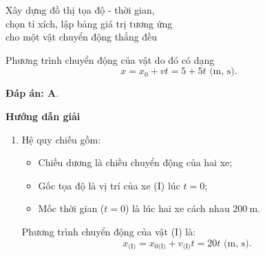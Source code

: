 \begin{dang}{Xây dựng đồ thị tọa độ - thời gian,\\ chọn tỉ xích, lập bảng giá trị tương ứng \\cho một vật chuyển động thẳng đều}
{		Phương trình chuyển động của vật do đó có dạng 
		\begin{equation*}
			x=x_0+vt=5+5t\textrm{ (m, s)}.
		\end{equation*}
		
		\textbf{Đáp án: A}.
	}
	{	\begin{center}
			\textbf{Hướng dẫn giải}
		\end{center}
		
		
		\begin{enumerate}[label=\alph*)]
			\item
			Hệ quy chiếu gồm:
			\begin{itemize}
				\item Chiều dương là chiều chuyển động của hai xe;
				\item Gốc tọa độ là vị trí của xe (I) lúc $t=0$;
				\item Mốc thời gian ($t=0$) là lúc hai xe cách nhau $\SI{200}{\meter}$.
			\end{itemize}
			
			Phương trình chuyển động của vật (I) là:
			\begin{equation*}
				x_\text{(I)}=x_{0\text{(I)}} + v_\text{(I)}t =20t\textrm{ (m, s)}.
			\end{equation*}
			

\end{enumerate}}
\end{dang}
